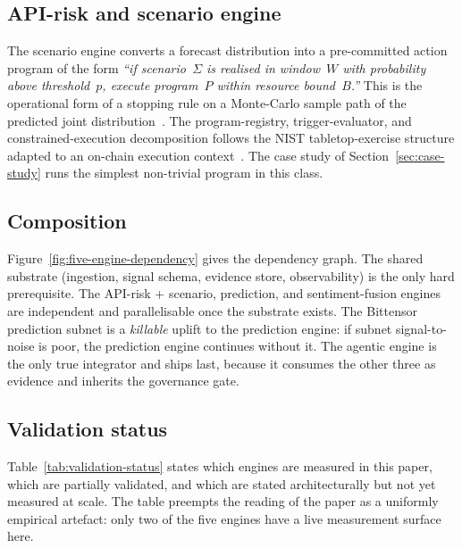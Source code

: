 \documentclass[11pt,a4paper]{article}
\begin{document}
\subsection*{API-risk and scenario engine}

The scenario engine converts a forecast distribution into a
pre-committed action program of the form \emph{``if scenario~$\Sigma$
is realised in window~$W$ with probability above threshold~$p$, execute
program~$P$ within resource bound~$B$.''} This is the operational form
of a stopping rule on a Monte-Carlo sample path of the predicted joint
distribution~\cite{glasserman2003monte}. The program-registry,
trigger-evaluator, and constrained-execution decomposition follows the
NIST tabletop-exercise structure adapted to an on-chain execution
context~\cite{nist2006sp80084}. The case study of
Section~\ref{sec:case-study} runs the simplest non-trivial program in
this class.

\subsection*{Composition}

Figure~\ref{fig:five-engine-dependency} gives the dependency graph. The
shared substrate (ingestion, signal schema, evidence store, observability)
is the only hard prerequisite. The API-risk + scenario, prediction, and
sentiment-fusion engines are independent and parallelisable once the
substrate exists. The Bittensor prediction subnet is a \emph{killable}
uplift to the prediction engine: if subnet signal-to-noise is poor, the
prediction engine continues without it. The agentic engine is the only
true integrator and ships last, because it consumes the other three as
evidence and inherits the governance gate.

\subsection*{Validation status}

Table~\ref{tab:validation-status} states which engines are measured in
this paper, which are partially validated, and which are stated
architecturally but not yet measured at scale. The table preempts the
reading of the paper as a uniformly empirical artefact: only two of the
five engines have a live measurement surface here.
\end{document}
